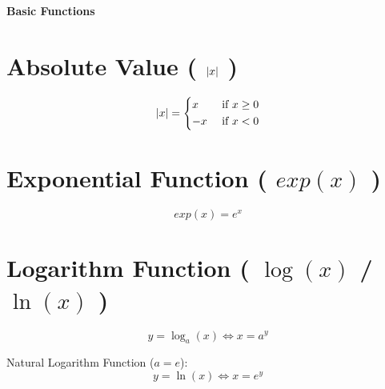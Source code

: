 \begingroup
\begin{center}
\fontsize{15}{15}\sffamily\selectfont
\textbf{Basic Functions}
\end{center}
\endgroup

\section{Absolute Value ( $\left| x \right|$ )}\label{abs_value}
\[
    \left|  x  \right| = \begin{dcases}
       x & \text{ if } x \geq 0 \\
       -x & \text{ if } x < 0 
    \end{dcases}
\]

\section{Exponential Function ( $exp(x)$ )}\label{Exponential Function}

\[
    exp(x) = e^x
\]


\section{Logarithm Function ( $\log(x)$ / $\ln(x)$ )}\label{Logarithm Function}
\[
    y = \log_a(x) \Leftrightarrow x = a^y
\]

Natural Logarithm Function ($a=e$):
\[
    y = \ln(x) \Leftrightarrow x = e^y
\]
